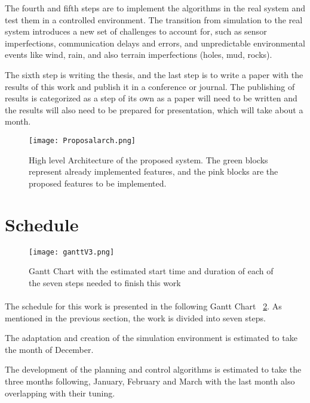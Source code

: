 The fourth and fifth steps are to implement the algorithms in the real system and test them in a controlled environment. The  
transition from simulation to the real system introduces a new set of challenges to account for, such as sensor imperfections, 
communication delays and errors, and unpredictable environmental events like wind, rain, and also terrain imperfections 
(holes, mud, rocks).

The sixth step is writing the thesis, and the last step is to write a paper with the results of this work and 
publish it in a conference or journal. The publishing of results is categorized as a step of its own as a paper 
will need to be written and the results will also need to be prepared for presentation, which will take about a month.
\clearpage

\begin{figure}[h]
    \centering
    \texttt{[image: Proposalarch.png]}
    \caption{High level Architecture of the proposed system. The green blocks represent already 
    implemented features, and the pink blocks are the proposed features to be implemented.}
    \label{fig:proposalarch}
\end{figure}


\section{Schedule}
\label{sec:schedule}
\begin{figure}[h]
    \centering
    \texttt{[image: ganttV3.png]}
    \caption{Gantt Chart with the estimated start time and duration of each of the seven steps needed to finish this work}
    \label{fig:schedule}
\end{figure}
\paragraph{}The schedule for this work is presented in the following Gantt Chart ~\ref{fig:schedule}. 
As mentioned in the previous section, the work is divided into seven steps. 

The adaptation and creation of the simulation environment is estimated to take the month of December. 

The development of the planning and control algorithms is estimated to take the 
three months following, January, February and March with the last month also overlapping with their tuning. 

